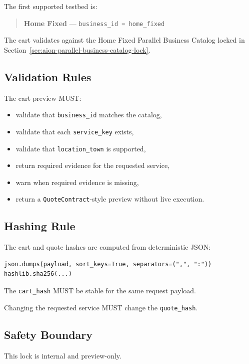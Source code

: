 The first supported testbed is:

\begin{quote}
\textbf{Home Fixed} --- \texttt{business\_id = home\_fixed}
\end{quote}

The cart validates against the Home Fixed Parallel Business Catalog locked in Section~\ref{sec:aion-parallel-business-catalog-lock}.

\subsection{Validation Rules}

The cart preview MUST:

\begin{itemize}
  \item validate that \texttt{business\_id} matches the catalog,
  \item validate that each \texttt{service\_key} exists,
  \item validate that \texttt{location\_town} is supported,
  \item return required evidence for the requested service,
  \item warn when required evidence is missing,
  \item return a \texttt{QuoteContract}-style preview without live execution.
\end{itemize}

\subsection{Hashing Rule}

The cart and quote hashes are computed from deterministic JSON:

\begin{verbatim}
json.dumps(payload, sort_keys=True, separators=(",", ":"))
hashlib.sha256(...)
\end{verbatim}

The \texttt{cart\_hash} MUST be stable for the same request payload.

Changing the requested service MUST change the \texttt{quote\_hash}.

\subsection{Safety Boundary}

This lock is internal and preview-only.

